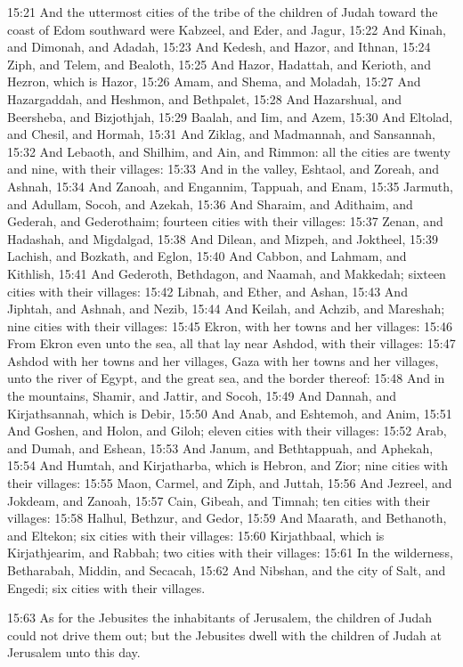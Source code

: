 15:21 And the uttermost cities of the tribe of the children of Judah toward the coast of Edom southward were Kabzeel, and Eder, and Jagur, 15:22 And Kinah, and Dimonah, and Adadah, 15:23 And Kedesh, and Hazor, and Ithnan, 15:24 Ziph, and Telem, and Bealoth, 15:25 And Hazor, Hadattah, and Kerioth, and Hezron, which is Hazor, 15:26 Amam, and Shema, and Moladah, 15:27 And Hazargaddah, and Heshmon, and Bethpalet, 15:28 And Hazarshual, and Beersheba, and Bizjothjah, 15:29 Baalah, and Iim, and Azem, 15:30 And Eltolad, and Chesil, and Hormah, 15:31 And Ziklag, and Madmannah, and Sansannah, 15:32 And Lebaoth, and Shilhim, and Ain, and Rimmon: all the cities are twenty and nine, with their villages: 15:33 And in the valley, Eshtaol, and Zoreah, and Ashnah, 15:34 And Zanoah, and Engannim, Tappuah, and Enam, 15:35 Jarmuth, and Adullam, Socoh, and Azekah, 15:36 And Sharaim, and Adithaim, and Gederah, and Gederothaim; fourteen cities with their villages: 15:37 Zenan, and Hadashah, and Migdalgad, 15:38 And Dilean, and Mizpeh, and Joktheel, 15:39 Lachish, and Bozkath, and Eglon, 15:40 And Cabbon, and Lahmam, and Kithlish, 15:41 And Gederoth, Bethdagon, and Naamah, and Makkedah; sixteen cities with their villages: 15:42 Libnah, and Ether, and Ashan, 15:43 And Jiphtah, and Ashnah, and Nezib, 15:44 And Keilah, and Achzib, and Mareshah; nine cities with their villages: 15:45 Ekron, with her towns and her villages: 15:46 From Ekron even unto the sea, all that lay near Ashdod, with their villages: 15:47 Ashdod with her towns and her villages, Gaza with her towns and her villages, unto the river of Egypt, and the great sea, and the border thereof: 15:48 And in the mountains, Shamir, and Jattir, and Socoh, 15:49 And Dannah, and Kirjathsannah, which is Debir, 15:50 And Anab, and Eshtemoh, and Anim, 15:51 And Goshen, and Holon, and Giloh; eleven cities with their villages: 15:52 Arab, and Dumah, and Eshean, 15:53 And Janum, and Bethtappuah, and Aphekah, 15:54 And Humtah, and Kirjatharba, which is Hebron, and Zior; nine cities with their villages: 15:55 Maon, Carmel, and Ziph, and Juttah, 15:56 And Jezreel, and Jokdeam, and Zanoah, 15:57 Cain, Gibeah, and Timnah; ten cities with their villages: 15:58 Halhul, Bethzur, and Gedor, 15:59 And Maarath, and Bethanoth, and Eltekon; six cities with their villages: 15:60 Kirjathbaal, which is Kirjathjearim, and Rabbah; two cities with their villages: 15:61 In the wilderness, Betharabah, Middin, and Secacah, 15:62 And Nibshan, and the city of Salt, and Engedi; six cities with their villages.

15:63 As for the Jebusites the inhabitants of Jerusalem, the children of Judah could not drive them out; but the Jebusites dwell with the children of Judah at Jerusalem unto this day.

